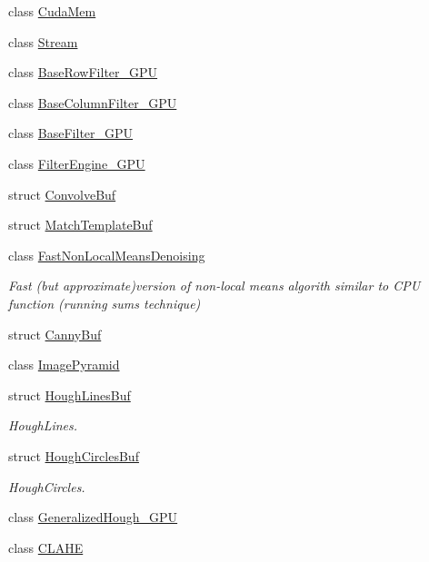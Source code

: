 \begin{DoxyCompactItemize}
\item 
class \hyperlink{classcv_1_1gpu_1_1CudaMem}{Cuda\-Mem}
\item 
class \hyperlink{classcv_1_1gpu_1_1Stream}{Stream}
\item 
class \hyperlink{classcv_1_1gpu_1_1BaseRowFilter__GPU}{Base\-Row\-Filter\-\_\-\-G\-P\-U}
\item 
class \hyperlink{classcv_1_1gpu_1_1BaseColumnFilter__GPU}{Base\-Column\-Filter\-\_\-\-G\-P\-U}
\item 
class \hyperlink{classcv_1_1gpu_1_1BaseFilter__GPU}{Base\-Filter\-\_\-\-G\-P\-U}
\item 
class \hyperlink{classcv_1_1gpu_1_1FilterEngine__GPU}{Filter\-Engine\-\_\-\-G\-P\-U}
\item 
struct \hyperlink{structcv_1_1gpu_1_1ConvolveBuf}{Convolve\-Buf}
\item 
struct \hyperlink{structcv_1_1gpu_1_1MatchTemplateBuf}{Match\-Template\-Buf}
\item 
class \hyperlink{classcv_1_1gpu_1_1FastNonLocalMeansDenoising}{Fast\-Non\-Local\-Means\-Denoising}
\begin{DoxyCompactList}\small\item\em Fast (but approximate)version of non-\/local means algorith similar to C\-P\-U function (running sums technique) \end{DoxyCompactList}\item 
struct \hyperlink{structcv_1_1gpu_1_1CannyBuf}{Canny\-Buf}
\item 
class \hyperlink{classcv_1_1gpu_1_1ImagePyramid}{Image\-Pyramid}
\item 
struct \hyperlink{structcv_1_1gpu_1_1HoughLinesBuf}{Hough\-Lines\-Buf}
\begin{DoxyCompactList}\small\item\em Hough\-Lines. \end{DoxyCompactList}\item 
struct \hyperlink{structcv_1_1gpu_1_1HoughCirclesBuf}{Hough\-Circles\-Buf}
\begin{DoxyCompactList}\small\item\em Hough\-Circles. \end{DoxyCompactList}\item 
class \hyperlink{classcv_1_1gpu_1_1GeneralizedHough__GPU}{Generalized\-Hough\-\_\-\-G\-P\-U}
\item 
class \hyperlink{classcv_1_1gpu_1_1CLAHE}{C\-L\-A\-H\-E}
\item 

\end{DoxyCompactItemize}
